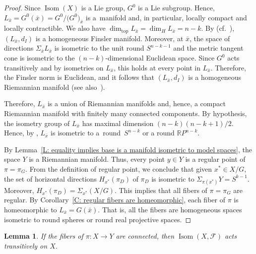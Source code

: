 \documentclass[10pt,a4paper]{amsart}
\numberwithin{equation}{section}
\newtheorem{lem}[thm]{Lemma}
\theoremstyle{definition}
\DeclareMathOperator{\Iso}{Isom}
\newcommand{\Sp}{S} %
\newcommand{\RP}{\mathbb{R}P} %
\newcommand{\fol}{\mathcal{F}}
\begin{document}
\begin{proof}
{\samepage
Since $\Iso(X)$ is a Lie group, $G^0$ is a Lie subgroup. Hence, $L_{\bar{x}}=G^0(\bar{x}) = G^0/\bigl(G^0\bigr)_{\bar{x}}$ is a~manifold and, in particular, locally compact and locally contractible. We also have
$\dim_{\mathrm{top}}L_{\bar{x}} = \dim_HL_{\bar{x}} = n-k$.
By \cite{BerestovskiiVershik1992} (cf.\ \cite[Theorem 13]{Berestovskii2014}), $(L_{\bar{x}},d_I)$ is a homogeneous Finsler manifold. Moreover, at $\bar{x}$, the space of directions $\Sigma_{\bar{x}}L_{\bar{x}}$ is isometric to the unit round $\Sp^{n-k-1}$ and the metric tangent cone is isometric to the $(n-k)$-dimensional Euclidean space. Since $G^0$ acts transitively and by isometries on $L_{\bar{x}}$, this holds at every point in $L_{\bar{x}}$. Therefore, the Finsler norm is Euclidean, and it follows that $(L_{\bar{x}},d_I)$ is a homogeneous Riemannian manifold (see also~\cite[Theorem~7]{Berestovskii1989}).

}


Therefore, $L_{\bar{x}}$ is a union of Riemannian manifolds and, hence, a compact Riemannian manifold with finitely many connected components.
By hypothesis, the isometry group of $L_{\bar{x}}$ has maximal dimension $(n-k)(n-k+1)/2$.
Hence, by \cite[Chapter~II, Theorem 3.1]{Kobayashi}, $L_{\bar{x}}$ is isometric to a~round~$\Sp^{n-k}$ or a round $\RP^{n-k}$.

By Lemma~\ref{L: equality implies base is a manifold isometric to model spaces}, the space $Y$ is a Riemannian manifold.
Thus, every point $y\in Y$ is a regular point of $\pi=\pi_G$.
From the definition of regular point, we conclude that given $x^\ast\in X/G$, the set of horizontal directions $H_{x^\ast}(\pi_D)$ of $\pi_D$ is isometric to $\Sigma_{\pi(x^\ast)}Y = \Sp^{k-1}$.
Moreover, $H_{x^\ast}(\pi_D) = \Sigma_{x^\ast}(X/G)$. This implies that all fibers of $\pi=\pi_G$ are regular.
By Corollary~\ref{C: regular fibers are homeomorphic}, each fiber of $\pi$ is homeomorphic to $L_{\bar{x}}=G(\bar{x})$.
That is, all the fibers are homogeneous spaces isometric to round spheres or round real projective spaces.
\end{proof}



\begin{lem}\label{L: Isom(X,F) acts transitively}
If the fibers of $\pi\colon X \to Y$ are connected, then $\Iso(X,\fol)$ acts transitively on $X$.
\end{lem}
\end{document}
